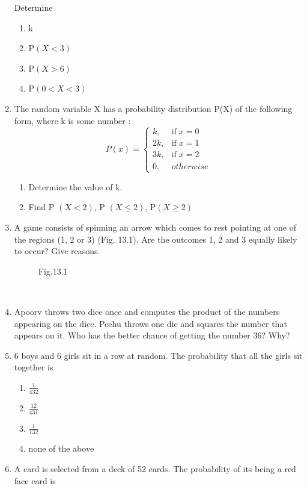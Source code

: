 \begin{enumerate}[label=\thesection.\arabic*,ref=\thesection.\theenumi]
Determine

\begin{enumerate}
\begin{table}[ht!]\centering

\end{table}
\item k
\item P$(X < 3)$
\item P$(X > 6)$
\item P$(0 < X < 3)$

\end{enumerate}

\item The random variable X has a probability distribution P(X) of the following form,
where k is some number :
\[P(x)=\begin{cases}
k, & \mbox{if}\; x= 0\\
2k, & \mbox{if}\; x= 1\\
3k, & \mbox{if}\; x= 2\\
0, & otherwise
\end{cases}\]
\begin{enumerate}
\item Determine the value of k.
\item Find P $(X < 2)$, P $(X \leq 2)$, P$(X \geq 2)$
\end{enumerate}
\item
A game consists of spinning an arrow which comes to rest pointing at one of the regions (1, 2 or 3) (Fig. 13.1). Are the outcomes 1, 2 and 3 equally likely to occur? Give reasons.\\
\begin{figure}[!ht]
	\begin{center}
		
		\resizebox{\columnwidth}{!}{}
	\end{center}
	\caption{Fig.13.1}
	\label{fig:circle.tex}	
\end{figure}\\
\solution

\item Apoorv throws two dice once and computes the product of the numbers appearing on the dice. Peehu throws one die and squares the number that appears on it. Who has the better chance of getting the number 36? Why?\\
\solution

\item 6 boys and 6 girls sit in a row at random. The probability that all the girls sit
together is
\begin{enumerate}
	\item $\frac{1}{432}$
	\item $\frac{12}{431}$
	\item $\frac{1}{132}$
	\item none of the above 
\end{enumerate}
			
\item A card is selected from a deck of 52 cards. The probability of its being a red face card is

\end{enumerate}
